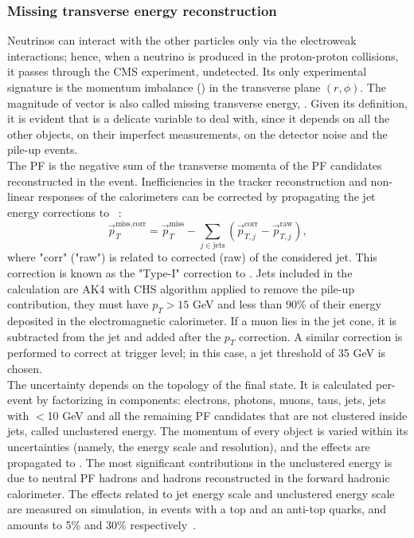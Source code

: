 \subsubsection{Missing transverse energy reconstruction}
Neutrinos can interact with the other particles only via the electroweak interactions; hence, when a neutrino is produced in the proton-proton collisions, it passes through the CMS experiment, undetected. Its only experimental signature is the momentum imbalance (\met) in the transverse plane $(r, \phi)$. The magnitude of \met vector is also called missing transverse energy, \MET. Given its definition, it is evident that \MET is a delicate variable to deal with, since it depends on all the other objects, on their imperfect measurements, on the detector noise and the pile-up events.\\
The PF \MET is the negative sum of the transverse momenta of the PF candidates reconstructed in the event. Inefficiencies in the tracker reconstruction and non-linear responses of the calorimeters can be corrected by propagating the jet energy corrections to \met~\cite{CMS:2016ljj}:
\begin{equation}
\vec{p}_T^{\text{miss,corr}} = \vec{p}_T^{\text{miss}} - \sum_{j \in \text{jets}} \left( \vec{p}_{T,j}^{\text{corr}} - \vec{p}_{T,j}^{\text{raw}}\right),
\label{eq:met_typeI}
\end{equation}
where "corr" ("raw") is related to corrected (raw) \pt of the considered jet. This correction is known as the "Type-I" correction to \MET. Jets included in the calculation are AK4 with CHS algorithm applied to remove the pile-up contribution, they must have $p_T>15$ GeV and less than 90\% of their energy deposited in the electromagnetic calorimeter. If a muon lies in the jet cone, it is subtracted from the jet and added after the $p_T$ correction. A similar correction is performed to correct \met at trigger level; in this case, a jet \pt threshold of 35 GeV is chosen.\\
The \MET uncertainty depends on the topology of the final state. It is calculated per-event by factorizing \met in components: electrons, photons, muons, taus, jets, jets with \pt$<$10 GeV and all the remaining PF candidates that are not clustered inside jets, called unclustered energy. The momentum of every object is varied within its uncertainties (namely, the energy scale and resolution), and the effects are propagated to \met. The most significant contributions in the unclustered energy is due to neutral PF hadrons and hadrons reconstructed in the forward hadronic calorimeter. The effects related to jet energy scale and unclustered energy scale are measured on simulation, in events with a top and an anti-top quarks, and amounts to 5\% and 30\% respectively~\cite{CMS:2016ljj}.\\

